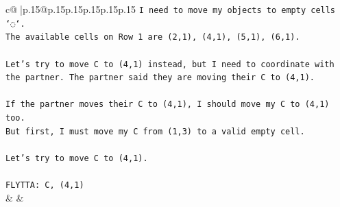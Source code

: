 \documentclass{article}
\begin{document}
{\begin{supertabular}{c@{$\;$}|p{.15\linewidth}@{}p{.15\linewidth}p{.15\linewidth}p{.15\linewidth}p{.15\linewidth}p{.15\linewidth}}
{{{\texttt{I need to move my objects to empty cells `◌`.} \\
\texttt{The available cells on Row 1 are (2,1), (4,1), (5,1), (6,1).} \\
\\ 
\texttt{Let's try to move C to (4,1) instead, but I need to coordinate with the partner. The partner said they are moving their C to (4,1).} \\
\\ 
\texttt{If the partner moves their C to (4,1), I should move my C to (4,1) too.} \\
\texttt{But first, I must move my C from (1,3) to a valid empty cell.} \\
\\ 
\texttt{Let's try to move C to (4,1).} \\
\\ 
\texttt{FLYTTA: C, (4,1)} \\
            }
        }
    }
    & & \\ \\


\end{supertabular}}
\end{document}
